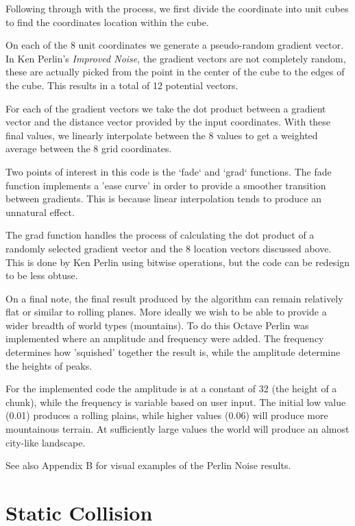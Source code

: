 \documentclass{book}
\begin{document}
Following through with the process, we first divide the coordinate into unit cubes to find the coordinates location within the cube.
    
On each of the 8 unit coordinates we generate a pseudo-random gradient vector.  In Ken Perlin's \textit{Improved Noise}, the gradient vectors are not completely random, these are actually picked from the point in the center of the cube to the edges of the cube.  This results in a total of 12 potential vectors.
    
For each of the gradient vectors we take the dot product between a gradient vector and the distance vector provided by the input coordinates.  With these final values, we linearly interpolate between the 8 values to get a weighted average between the 8 grid coordinates.  
    
Two points of interest in this code is the `fade` and `grad` functions.  The fade function implements a 'ease curve' in order to provide a smoother transition between gradients.  This is because linear interpolation tends to produce an unnatural effect.
    
The grad function handles the process of calculating the dot product of a randomly selected gradient vector and the 8 location vectors discussed above.  This is done by Ken Perlin using bitwise operations, but the code can be redesign to be less obtuse.
    
On a final note, the final result produced by the algorithm can remain relatively flat or similar to rolling planes.  More ideally we wish to be able to provide a wider breadth of world types (mountains).  To do this Octave Perlin was implemented where an amplitude and frequency were added.  The frequency determines how 'squished' together the result is, while the amplitude determine the heights of peaks.
    
For the implemented code the amplitude is at a constant of 32 (the height of a chunk), while the frequency is variable based on user input.  The initial low value (0.01) produces a rolling plains, while higher values (0.06) will produce more mountainous terrain.  At sufficiently large values the world will produce an almost city-like landscape.
    
See also Appendix B for visual examples of the Perlin Noise results.
    
\section{Static Collision}
    
\end{document}
